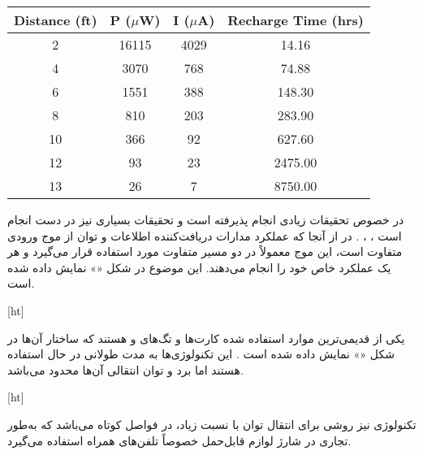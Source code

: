 \begin{latin}
\begin{center}
	\begin{table}[h!]
		\centering
		\begin{tabular}{cccc}
			\toprule
			Distance (ft) & P ($\mu$W) & I ($\mu$A) & Recharge Time (hrs) \\
			\midrule
			2 & 16115 & 4029 & 14.16 \\
			4 & 3070 & 768 & 74.88 \\
			6 & 1551 & 388 & 148.30 \\
			8 & 810 & 203 & 283.90 \\
			10 & 366 & 92 & 627.60 \\
			12 & 93 & 23 & 2475.00 \\
			13 & 26 & 7 & 8750.00 \\
			\bottomrule
		\end{tabular}
		\caption{}
		\label{تاثیر نوع آنتن بر انرژی جذب شده}
	\end{table}
\end{center} 
\end{latin}




در خصوص  تحقیقات زیادی انجام پذیرفته است و تحقیقات بسیاری نیز در دست انجام است ، ، . در  از آنجا که عملکرد مدارات دریافت‌کننده اطلاعات و توان از موج  ورودی متفاوت است، این موج معمولاً در دو مسیر متفاوت مورد استفاده قرار می‌گیرد و هر یک عملکرد خاص خود را انجام می‌دهند. این موضوع در شکل «» نمایش داده شده است.


[ht]


یکی از قدیمی‌ترین موارد استفاده شده  کارت‌ها و تگ‌های  و  هستند که ساختار آن‌ها در شکل «» نمایش داده شده است . این تکنولوژی‌ها به مدت طولانی در حال استفاده هستند اما برد و توان انتقالی آن‌ها محدود می‌باشد.


[ht]


تکنولوژی  نیز روشی برای انتقال توان با نسبت زیاد، در فواصل کوتاه می‌باشد که به‌طور تجاری در شارژ لوازم قابل‌حمل خصوصاً تلفن‌های همراه استفاده می‌گیرد.

